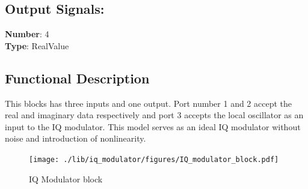 \subsection*{Output Signals:}
\textbf{Number}: 4\\
\textbf{Type}: RealValue

\subsection*{Functional Description}
This blocks has three inputs and one output. Port number 1 and 2 accept the real and imaginary data respectively and port 3 accepts the local oscillator as an input to the IQ modulator. This model serves as an ideal IQ modulator without noise and introduction of nonlinearity.
\begin{figure}[h]
	\centering
	\texttt{[image: ./lib/iq\_modulator/figures/IQ\_modulator\_block.pdf]}
	\label{IQ_modulator_block}\caption{IQ Modulator block}
\end{figure}

